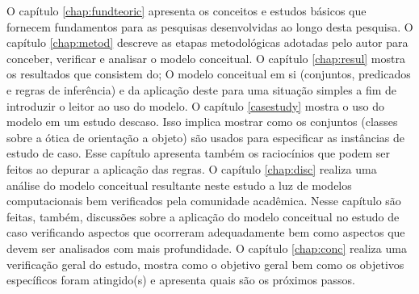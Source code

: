 O capítulo \ref{chap:fundteoric} apresenta os conceitos e estudos básicos que fornecem fundamentos para as pesquisas desenvolvidas ao longo desta pesquisa. O capítulo \ref{chap:metod} descreve as etapas metodológicas adotadas pelo autor para conceber, verificar e analisar o modelo conceitual. O capítulo \ref{chap:resul} mostra os resultados que consistem do; O modelo conceitual em si (conjuntos, predicados e regras de inferência) e da aplicação deste para uma situação simples a fim de introduzir o leitor ao uso do modelo. O capítulo \ref{casestudy} mostra o uso do modelo em um estudo descaso. Isso implica mostrar como os conjuntos (classes sobre a ótica de orientação a objeto) são usados para especificar as instâncias de estudo de caso. Esse capítulo apresenta também os raciocínios que podem ser feitos ao depurar a aplicação das regras. O capítulo \ref{chap:disc} realiza uma análise do modelo conceitual resultante neste estudo a luz de modelos computacionais bem verificados pela comunidade acadêmica. Nesse capítulo são feitas, também, discussões sobre a aplicação do modelo conceitual no estudo de caso verificando aspectos que ocorreram adequadamente bem como aspectos que devem ser analisados com mais profundidade. O capítulo \ref{chap:conc} realiza uma verificação geral do estudo, mostra como o objetivo geral bem como os objetivos específicos foram atingido(s) e apresenta quais são os próximos passos. 